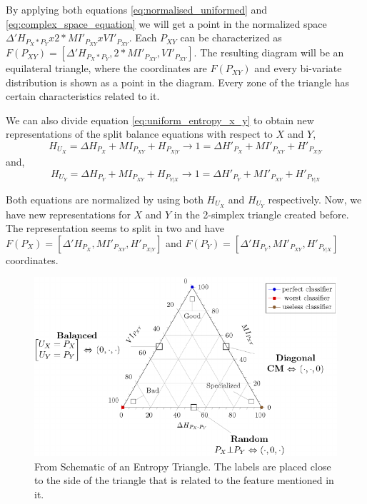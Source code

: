 By applying both equations \ref{eq:normalised_uniformed} and \ref{eq:complex_space_equation} we will get a point in the normalized space  $\Delta'H_{P_{X} * P_{Y}} x 2*MI'_{P_{XY}} x VI'_{P_{XY}}$. Each $P_{XY}$ can be characterized as $F(P_{XY}) = [\Delta'H_{P_{X} * P_{Y}},2*MI'_{P_{XY}},VI'_{P_{XY}}] $. The resulting diagram will be an equilateral triangle, where the coordinates are $F(P_{XY})$ and every bi-variate distribution is shown as a point in the diagram. Every zone of the triangle has certain characteristics related to it. \par

We can also divide equation \ref{eq:uniform_entropy_x_y} to obtain new representations of the split balance equations with respect to $X$ and $Y$,
%
\begin{equation}\label{eq:entropy_x_balance}
H_{U_{X}} = \Delta H_{P_{X}} + MI_{P_{XY}} + H_{P_{X|Y}}  \rightarrow 1 = \Delta H'_{P_{X}} + MI'_{P_{XY}} + H'_{P_{X|Y}}
\end{equation}
and,
\begin{equation}\label{eq:entropy_y_balance}
H_{U_{Y}} = \Delta H_{P_{Y}} + MI_{P_{XY}} + H_{P_{Y|X}}  \rightarrow 1 = \Delta H'_{P_{Y}} + MI'_{P_{XY}} + H'_{P_{Y|X}}
\end{equation}

Both equations are normalized by using both $H_{U_{X}}$ and $H_{U_{Y}}$ respectively. Now, we have new representations for $X$ and $Y$ in the 2-simplex triangle created before. The representation seems to split in two and have $F(P_X) = [\Delta'H_{P_{X}},MI'_{P_{XY}},H'_{P_{X|Y}}] $ and $F(P_Y) = [\Delta'H_{P_{Y}},MI'_{P_{XY}},H'_{P_{Y|X}}]$ coordinates.\newline
%
\begin{figure}[H]
 \centering
  \includegraphics[width=15cm]{Figuras_tfg/ET_Labelled.png}
  \caption{From \cite{val:pel:18c} Schematic of an Entropy Triangle. The labels are placed close to the side of the triangle that is related to the feature mentioned in it.}
 \label{fig:figure_labelled_et}
\end{figure} 

